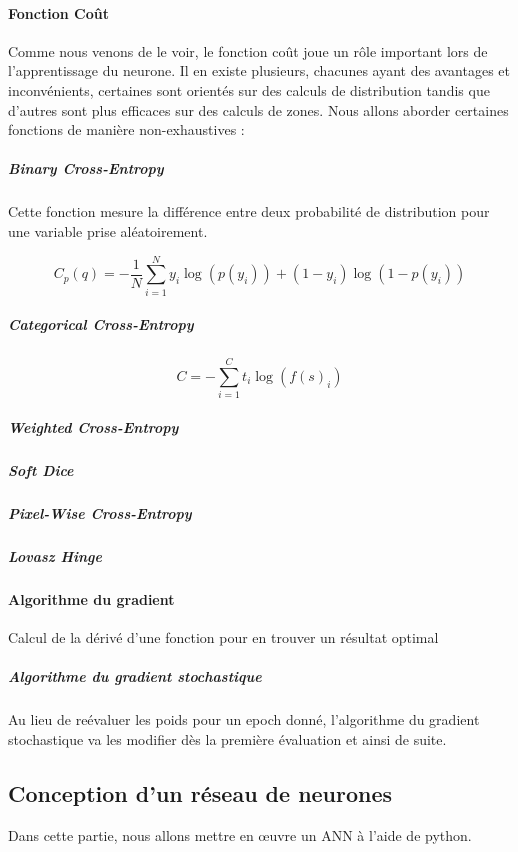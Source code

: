 \paragraph{Fonction Co\^ut}

Comme nous venons de le voir, le fonction co\^ut joue un r\^ole important lors de l'apprentissage du neurone.
Il en existe plusieurs, chacunes ayant des avantages et inconvénients, certaines sont orientés sur des calculs de distribution tandis que d'autres sont plus efficaces sur des calculs de zones. Nous allons aborder certaines fonctions de manière non-exhaustives :

\subparagraph{Binary Cross-Entropy} Cette fonction mesure la différence entre deux probabilité de distribution pour une variable prise aléatoirement.

\begin{equation}
	C_p (q) = - \frac{1}{N} \sum_{i=1}^{N} y_i \log(p(y_i)) + (1 - y_i)\log(1-p(y_i))
\end{equation}

\subparagraph{Categorical Cross-Entropy}

\begin{equation}
	C = - \sum_{i = 1}^{C} t_i \log(f(s)_i)
\end{equation}

\subparagraph{Weighted Cross-Entropy}

\subparagraph{Soft Dice}

\subparagraph{Pixel-Wise Cross-Entropy}

\subparagraph{Lovasz Hinge}

\paragraph{Algorithme du gradient}
Calcul de la dérivé d'une fonction pour en trouver un résultat optimal

\subparagraph{Algorithme du gradient stochastique}
Au lieu de reévaluer les poids pour un epoch donné, l'algorithme du gradient stochastique va les modifier dès la première évaluation et ainsi de suite.

\subsection{Conception d'un réseau de neurones}
Dans cette partie, nous allons mettre en \oe uvre un \gls{ANN} à l'aide de python.

